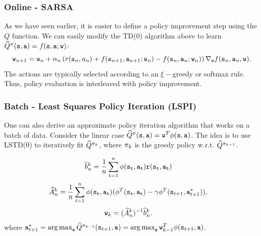 \subsubsection{Online - SARSA}
As we have seen earlier, it is easier to define a policy improvement step using the $Q$ function. We can easily modify the TD(0) algorithm above to learn $\widehat{Q}^\pi({\tt s},{\tt a}) = f({\tt s},{\tt a};{\tt w})$:
\begin{equation*}
    {\tt w}_{n+1} = {\tt w}_n + \alpha_n \left( r({\tt s}_n,a_n) + f({\tt s}_{n+1},{\tt a}_{n+1};{\tt w}_n) - f({\tt s}_{n},{\tt a}_{n}; {\tt w}_n) \right) \nabla_{{\tt w}} f({\tt s}_n,{\tt a}_n,{\tt w}).
\end{equation*}
The actions are typically selected according to an $\xi-$greedy or softmax rule. Thus, policy evaluation is interleaved with policy improvement.

\subsubsection{Batch - Least Squares Policy Iteration (LSPI)}
One can also derive an approximate policy iteration algorithm that works on a batch of data. Consider the linear case $\widehat{Q}^\pi({\tt s},{\tt a}) = {\tt w}^T \phi({\tt s},{\tt a})$. The idea is to use LSTD(0) to iteratively fit $\widehat{Q}^{\pi_k}$, where $\pi_k$ is the greedy policy w.r.t. $\widehat{Q}^{\pi_{k-1}}$.

\begin{align*}
\widehat{b}_n^k &= \frac{1}{n} \sum_{{\tt t}=1}^n  {\phi}({\tt s}_{\tt t}, {\tt a}_{\tt t}) {\tt r}({\tt s}_{\tt t},{\tt a}_{\tt t}) 
\end{align*}
\begin{align*}
\widehat{A}_n^k &= \frac{1}{n} \sum_{t=1}^n {\phi}({\tt s}_{\tt t},{\tt a}_{\tt t})( {\phi}^T({\tt s}_{\tt t},{\tt a}_{\tt t})-\gamma {\phi}^T({\tt s}_{t+1},{\tt a}^*_{t+1})),
\end{align*}
\begin{align*}
{\tt w}_k &= (\widehat{A}_n^k)^{-1} \widehat{b}_n^k.
\end{align*}
where $\action^*_{t+1} = \argmax_\action \widehat{Q}^{\policy_{k-1}}(\state_{t+1},\action) = \argmax_\action \weights_{k-1}^T\ftrs(\state_{t+1},\action)$.

